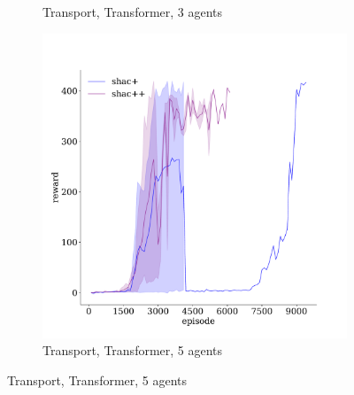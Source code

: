 \begin{figure}[!t]
\begin{subfigure}[b]{0.32\textwidth}
        \caption{Transport, Transformer, 3 agents}
        \label{fig:transport-ablation-transformer-3}
    \end{subfigure}
    \begin{subfigure}[b]{0.32\textwidth}
        \includegraphics[width=\textwidth]{figs/transport-ablation-5-transformer.pdf}
        \caption{Transport, Transformer, 5 agents}
        \label{fig:transport-ablation-transformer-5}
    \end{subfigure}


\end{figure}
